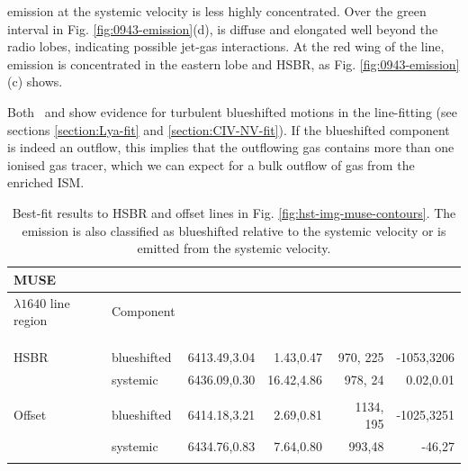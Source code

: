  emission at the systemic velocity is less highly concentrated. Over the green interval in Fig. \ref{fig:0943-emission}(d),  is diffuse and elongated well beyond the radio lobes, indicating possible jet-gas interactions. At the red wing of the line,  emission is concentrated in the eastern lobe and HSBR, as Fig. \ref{fig:0943-emission}(c) shows. 

Both \lya~and  show evidence for turbulent blueshifted motions in the line-fitting (see sections \ref{section:Lya-fit} and \ref{section:CIV-NV-fit}). If the blueshifted component is indeed an outflow, this implies that the outflowing gas contains more than one ionised gas tracer, which we can expect for a bulk outflow of gas from the enriched ISM. 

\begin{table}
\caption[Best-fit  emission line results]{Best-fit results to  HSBR and offset lines in Fig. \ref{fig:hst-img-muse-contours}. The emission is also classified as blueshifted relative to the systemic velocity or is emitted from the systemic velocity.}    
\centering                          
\begin{tabular}{ l l D{,}{\, \,\pm\, \,}{-3} D{,}{\, \,\pm\, \,}{-3} D{,}{\, \,\pm\, \,}{-3} D{,}{\, \,\pm\, \,}{-3} }
\hline\hline MUSE  \\
\hline            
{}$\lambda1640$ line region  
& Component 
&  
&  
& 
&    \\ 
&  
& \mc{$\lam$ (\ang)} 
& 
&  
& \mc{$\Delta \varv$} \\  
&  &  & \mc{} & \mc{} &\mc{} \\  
\hline     
&  &  & \mc{} & \mc{} &\mc{} \\  
HSBR    & blueshifted   & 6413.49,3.04   & 1.43,0.47       & 970, 225       & -1053,3206  \\  
              & systemic       & 6436.09,0.30  & 16.42,4.86    & 978, 24         & 0.02,0.01 \\ 
&  &  & \mc{} & \mc{} &\mc{} \\                                  
Offset  & blueshifted     & 6414.18,3.21  & 2.69,0.81                & 1134, 195     & -1025,3251\\  
            & systemic        & 6434.76,0.83  & 7.64,0.80             & 993,48          & -46,27 \\   
&  &  & \mc{} & \mc{} &\mc{} \\   
\hline                                   
\end{tabular} 
\label{table:HeII-nucleus-offset}  
\end{table}

